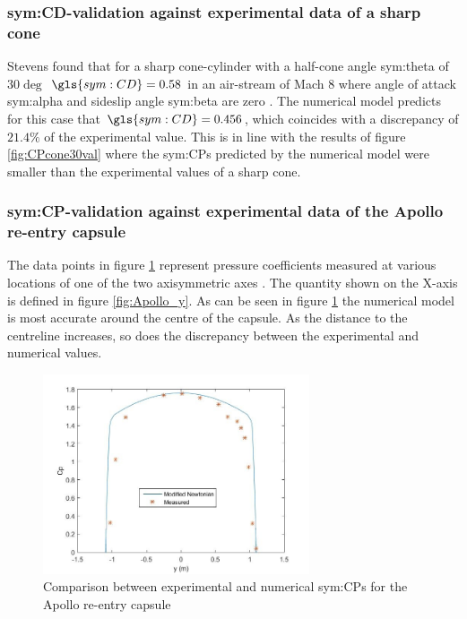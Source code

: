 \subsubsection{\gls{sym:CD}-validation against experimental data of a sharp cone}
\label{subsubsec:valsharpconeCD}
Stevens found that for a sharp cone-cylinder with a half-cone angle \gls{sym:theta} of $30\deg$ $\gls{sym:CD}=0.58$ in an air-stream of Mach $8$ where angle of attack \gls{sym:alpha} and sideslip angle \gls{sym:beta} are zero \cite{Stevens1950,AndersonJr.2007}. The numerical model predicts for this case that $\gls{sym:CD}=0.456$, which coincides with a discrepancy of $21.4\%$ of the experimental value. This is in line with the results of figure \ref{fig:CPcone30val} where the \glspl{sym:CP} predicted by the numerical model were smaller than the experimental values of a sharp cone.

\subsubsection{\gls{sym:CP}-validation against experimental data of the Apollo re-entry capsule}
\label{subsubsec:Apollo_validation}
The data points in figure \ref{fig:Apollo_cp} represent pressure coefficients measured at various locations of one of the two axisymmetric axes \cite{Bertin1966}. The quantity shown on the X-axis is defined in figure \ref{fig:Apollo_y}. As can be seen in figure \ref{fig:Apollo_cp} the numerical model is most accurate around the centre of the capsule. As the distance to the centreline increases, so does the discrepancy between the experimental and numerical values.

\begin{figure}[h]
	\centering
	\includegraphics[width=0.7\textwidth]{./Figure/Apollo_cp}
	\caption{Comparison between experimental and numerical \glspl{sym:CP} for the Apollo re-entry capsule}
	\label{fig:Apollo_cp}
\end{figure}

